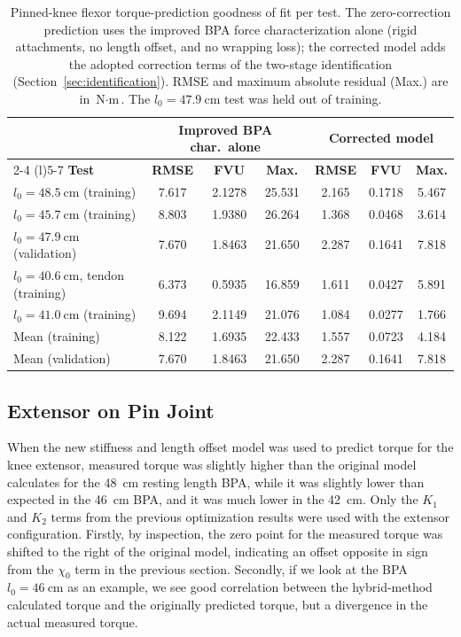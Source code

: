 \begin{table}[htbp]
\caption{Pinned-knee flexor torque-prediction goodness of fit per test. The zero-correction prediction uses the improved BPA force characterization alone (rigid attachments, no length offset, and no wrapping loss); the corrected model adds the adopted correction terms of the two-stage identification (Section~\ref{sec:identification}). RMSE and maximum absolute residual (Max.) are in $\text{N}\cdot\text{m}$. The $l_{0}=\qty{47.9}{\cm}$ test was held out of training.}
\label{tab:FlxPinGof}
\begin{tabular}{@{}lcccccc@{}}
\toprule
& \multicolumn{3}{c}{\textbf{Improved BPA char.\ alone}} & \multicolumn{3}{c}{\textbf{Corrected model}} \\
\cmidrule(lr){2-4} \cmidrule(l){5-7}
\textbf{Test} & \textbf{RMSE} & \textbf{FVU} & \textbf{Max.} & \textbf{RMSE} & \textbf{FVU} & \textbf{Max.} \\
\midrule
$l_{0}=\qty{48.5}{\cm}$ (training)    & 7.617 & 2.1278 & 25.531 & 2.165 & 0.1718 & 5.467 \\
$l_{0}=\qty{45.7}{\cm}$ (training)    & 8.803 & 1.9380 & 26.264 & 1.368 & 0.0468 & 3.614 \\
$l_{0}=\qty{47.9}{\cm}$ (validation)  & 7.670 & 1.8463 & 21.650 & 2.287 & 0.1641 & 7.818 \\
$l_{0}=\qty{40.6}{\cm}$, tendon (training) & 6.373 & 0.5935 & 16.859 & 1.611 & 0.0427 & 5.891 \\
$l_{0}=\qty{41.0}{\cm}$ (training)    & 9.694 & 2.1149 & 21.076 & 1.084 & 0.0277 & 1.766 \\
\midrule
Mean (training)                       & 8.122 & 1.6935 & 22.433 & 1.557 & 0.0723 & 4.184 \\
Mean (validation)                     & 7.670 & 1.8463 & 21.650 & 2.287 & 0.1641 & 7.818 \\
\bottomrule
\end{tabular}
\end{table}

\subsection{Extensor on Pin Joint}

When the new stiffness and length offset model was used to predict torque for the knee extensor, measured torque was slightly higher than the original model calculates for the \qty{48}{\cm} resting length BPA, while it was slightly lower than expected in the \qty{46}{\cm} BPA, and it was much lower in the \qty{42}{\cm}. Only the $K_{1}$ and $K_{2}$ terms from the previous optimization results were used with the extensor configuration. Firstly, by inspection, the zero point for the measured torque was shifted to the right of the original model, indicating an offset opposite in sign from the $\chi_{0}$ term in the previous section. Secondly, if we look at the BPA $l_{0}=\qty{46}{\cm}$ as an example, we see good correlation between the hybrid-method calculated torque and the originally predicted torque, but a divergence in the actual measured torque. 

